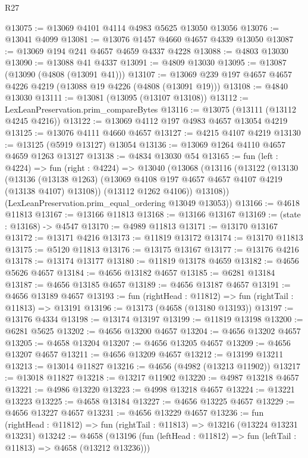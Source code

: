 \begin{lexlean}{R27}
\begin{coremodule}
@13075 := @13069 @4101 @4114 @4983 @5625 @13050 @13056
@13076 := @13041 @4099
@13081 := @13076 @1457 @4660 @4657 @4339 @13050
@13087 := @13069 @194 @241 @4657 @4659 @4337 @4228
@13088 := @4803 @13030
@13090 := @13088 @41 @4337
@13091 := @4809 @13030
@13095 := @13087 (@13090 (@4808 (@13091 @41)))
@13107 := @13069 @239 @197 @4657 @4657 @4226 @4219 (@13088 @19 @4226 (@4808 (@13091 @19)))
@13108 := @4840 @13030
@13111 := @13081 (@13095 (@13107 @13108))
@13112 := LexLeanPreservation.prim_compareBytes
@13116 := @13075 (@13111 (@13112 @4245 @4216))
@13122 := @13069 @4112 @197 @4983 @4657 @13054 @4219
@13125 := @13076 @4111 @4660 @4657
@13127 := @4215 @4107 @4219
@13130 := @13125 (@5919 @13127) @13054
@13136 := @13069 @1264 @4110 @4657 @4659 @1263 @13127
@13138 := @4834 @13030 @54
@13165 := fun (left : @4224) =>
  fun (right : @4224) =>
  @13040
    (@13068
      (@13116
        (@13122
          (@13130
            (@13136
              (@13138 @1263)
              (@13069 @4108 @197 @4657 @4657 @4107 @4219 (@13138 @4107) @13108))
            (@13112 @1262 @4106))
          @13108))
      (LexLeanPreservation.prim_equal_ordering @13049 @13053))
@13166 := @4618 @11813
@13167 := @13166 @11813
@13168 := @13166 @13167
@13169 := (state : @13168) -> @4547
@13170 := @4989 @11813
@13171 := @13170 @13167
@13172 := @13171 @4216
@13173 := @11819 @13172
@13174 := @13170 @11813
@13175 := @5120 @11813
@13176 := @13175 @13167
@13177 := @13176 @4216
@13178 := @13174 @13177
@13180 := @11819 @13178 @4659
@13182 := @4656 @5626 @4657
@13184 := @4656 @13182 @4657
@13185 := @6281 @13184
@13187 := @4656 @13185 @4657
@13189 := @4656 @13187 @4657
@13191 := @4656 @13189 @4657
@13193 := fun (rightHead : @11812) => fun (rightTail : @11813) => @13191
@13196 := @13173 (@4658 (@13180 @13193))
@13197 := @13176 @4334
@13198 := @13174 @13197
@13199 := @11819 @13198
@13200 := @6281 @5625
@13202 := @4656 @13200 @4657
@13204 := @4656 @13202 @4657
@13205 := @4658 @13204
@13207 := @4656 @13205 @4657
@13209 := @4656 @13207 @4657
@13211 := @4656 @13209 @4657
@13212 := @13199 @13211
@13213 := @13014 @11827
@13216 := @4656 (@4982 (@13213 @11902))
@13217 := @13018 @11827
@13218 := @13217 @11902
@13220 := @4987 @13218 @4657
@13221 := @4986 @13220
@13223 := @4998 @13218 @4657
@13224 := @13221 @13223
@13225 := @4658 @13184
@13227 := @4656 @13225 @4657
@13229 := @4656 @13227 @4657
@13231 := @4656 @13229 @4657
@13236 := fun (rightHead : @11812) => fun (rightTail : @11813) => @13216 (@13224 @13231 @13231)
@13242 := @4658
    (@13196 (fun (leftHead : @11812) => fun (leftTail : @11813) => @4658 (@13212 @13236)))

\end{coremodule}
\end{lexlean}
